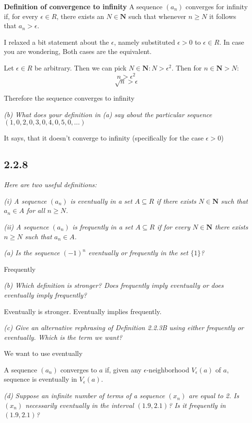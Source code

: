 \documentclass[11pt,oneside,titlepage]{book}
\begin{document}
\textbf{Definition of convergence to infinity}
A sequence $(a_n)$ converges for infinity if, for every $\epsilon \in R$, there exists an
$N \in \textbf{N}$ such that whenever $n \geq N$ it follows that $a_n > \epsilon$.

I relaxed a bit statement about the $\epsilon$, namely substituted $\epsilon > 0$ to
$\epsilon \in R$. In case you are wondering, Both cases are the equivalent.

Let $\epsilon \in R$ be arbitrary. Then we can pick $N \in \textbf{N}: N > \epsilon ^ 2$.
Then for $n \in \textbf{N} > N$:
$$n > \epsilon ^ 2$$
$$\sqrt{n} > \epsilon$$

Therefore the sequence converges to infinity

\textit{(b) What does your definition in (a) say about the particular sequence
  $(1, 0, 2, 0, 3, 0, 4, 0, 5, 0, ...)$}

It says, that it doesn't converge to infinity (specifically for the case $\epsilon > 0$)

\subsection*{2.2.8}
\textit{Here are two useful definitions:}

\textit{(i) A sequence $(a_n)$ is eventually in a set $A \subseteq R$ if there exists
  $N \in \textbf{N}$ such that $a_n \in A$ for all $n \geq N$.}

\textit{(ii) A sequence $(a_n)$ is frequently in a set $A \subseteq R$ if for every
  $N \in \textbf{N}$ there exists $n \geq N$ such that $a_n \in A$.
}

\textit{(a) Is the sequence $(-1)^n$ eventually or frequently in the set $\{1\}$?}

Frequently

\textit{(b) Which definition is stronger? Does frequently imply eventually or does
  eventually imply frequently?}

Eventually is stronger. Eventually implies frequently.

\textit{(c) Give an alternative rephrasing of Definition 2.2.3B using either frequently
  or eventually. Which is the term we want?}

We want to use eventually

A sequence $(a_n)$ converges to $a$ if, given any $\epsilon$-neighborhood $V_\epsilon(a)$ of
$a$, sequence is eventually in $V_\epsilon(a)$.

\textit{(d) Suppose an infinite number of terms of a sequence $(x_n)$ are equal to 2.
  Is $(x_n)$ necessarily eventually in the interval $(1.9, 2.1)$? Is it frequently in
  $(1.9, 2.1)$?}
\end{document}
